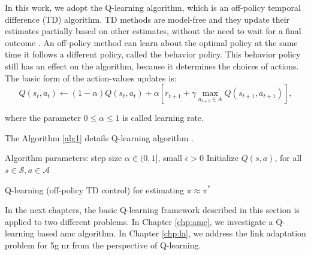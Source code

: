 In this work, we adopt the Q-learning algorithm, which is an off-policy temporal difference (TD) algorithm.
%
TD methods are model-free and they update their estimates partially based on other estimates, without the need to wait for a final outcome \cite{sutton2018rl}.
%
An off-policy method can learn about the optimal policy at the same time it follows a different policy, called the behavior policy.
%
This behavior policy still has an effect on the algorithm, because it determines the choices of actions. The basic form of the action-values updates is:
\begin{equation}\label{QlearningEq}
    Q\left(s_{t}, a_{t}\right) \leftarrow  (1-\alpha) Q\left(s_{t}, a_{t}\right)
    +\alpha\left[r_{t+1}+\gamma \max _{a_{t+1} \in A} Q\left(s_{t+1}, a_{t+1}\right)\right],
\end{equation}

\noindent where the parameter $0 \leq \alpha \leq 1$ is called learning rate.

The Algorithm \ref{alg1} details Q-learning algorithm \cite{sutton2018rl}.

\begin{algorithm}[!t]

Algorithm parameters: step size $\alpha \in (0, 1]$, small $\epsilon > 0$\;
Initialize $Q(s, a)$, for all $s \in \mathcal{S}, a \in \mathcal{A}$\;
\caption{Q-learning (off-policy TD control) for estimating $\pi \approx \pi^* $}
  \label{alg1}
\end{algorithm}

In the next chapters, the basic Q-learning framework described in this section is applied to two different problems.
%
In Chapter \ref{chp:amc}, we investigate a Q-learning based \gls{amc} algorithm.
%
In Chapter \ref{chp:la}, we address the link adaptation problem for \gls{5g} \gls{nr} from the perspective of Q-learning.
